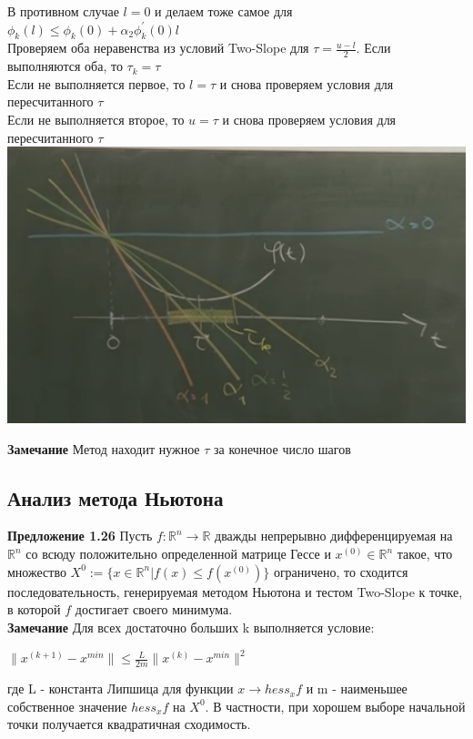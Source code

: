\checkmark В противном случае $l=0$ и делаем тоже самое для $\phi_{k}(l)\leq\phi_{k}(0)+\alpha_{2}\phi^{'}_{k}(0)l$\\
\checkmark Проверяем оба неравенства из условий Two-Slope для $\tau=\frac{u-l}{2}$. Если выполняются оба, то $\tau_{k}=\tau$\\
Если не выполняется первое, то $l=\tau$ и снова проверяем условия для пересчитанного $\tau$\\
Если не выполняется второе, то $u=\tau$ и снова проверяем условия для пересчитанного $\tau$\\
\includegraphics[scale=0.8]{image1.png}


{\bf Замечание} Метод находит нужное $\tau$ за конечное число шагов
\newpage
\subsection{Анализ метода Ньютона}

{\bf Предложение 1.26} Пусть $f: \mathbb{R}^n \to \mathbb{R}$ дважды непрерывно дифференцируемая на $\mathbb{R}^n$ со всюду положительно определенной матрице Гессе и $x^{(0)}\in\mathbb{R}^n$ такое, что множество $X^{0}:=\{x\in\mathbb{R}^{n}| f(x)\leq f(x^{(0)})\}$ ограничено, то сходится последовательность, генерируемая методом Ньютона и тестом Two-Slope к точке, в которой $f$ достигает своего минимума.\\

{\bf Замечание} Для всех достаточно больших k выполняется условие:
\begin{center}$\|x^{(k+1)}-x^{min}\|\leq \frac{L}{2m}\|x^{(k)}-x^{min}\|^{2}$\end{center}
где L - константа Липшица для функции $x\rightarrow hess_{x}f$ и m - наименьшее собственное значение $ hess_{x}f$ на $X^{0}$. В частности, при хорошем выборе начальной точки получается квадратичная сходимость.

